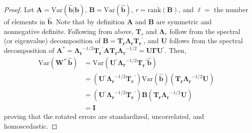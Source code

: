 \documentclass{article} %
\newcommand{\trans}{\ensuremath{^\prime}}
\newcommand{\var}{\ensuremath{\mathrm{Var}}}
\begin{document}
\begin{proof}
 Let $\bm{A} = \var(\widehat{\bm{b}} | \bm{b})$, $\bm{B} = \var(\widehat{\bm{b}})$, $r = \text{rank}(\bm{B})$, and $\ell = $ the number of elements in $\widehat{\bm{b}}$. Note that by definition $\bm{A}$ and $\bm{B}$ are symmetric and nonnegative definite. Following from above, $\bm{T}_r$ and $\bm{\Lambda}_r$ follow from the spectral (or eigenvalue) decomposition of $\bm{B} = \bm{T_r \Lambda_r T_r}\trans$, and $\bm{U}$ follows from the spectral decomposition of $\bm{A^*} = \bm{\Lambda_r}^{-1/2} \bm{T_r}\trans \bm{A T_r \Lambda_r}^{-1/2} = \bm{U} \bm{\Gamma} \bm{U}\trans$. Then, 
\begin{align*}
\var(\bm{W}^{*\prime} \widehat{\bm{b}}) &= \var(\bm{U}\trans \bm{\Lambda_r}^{-1/2} \bm{T_r}\trans \widehat{\bm{b}})\\
&= (\bm{U}\trans \bm{\Lambda_r}^{-1/2} \bm{T_r}\trans) \var(\widehat{\bm{b}}) (\bm{T_r \Lambda_r}^{-1/2} \bm{U})\\
&= (\bm{U}\trans \bm{\Lambda_r}^{-1/2} \bm{T_r}\trans) \bm{B} (\bm{T_r \Lambda_r}^{-1/2} \bm{U})\\
&= \bm{I}
\end{align*}
proving that the rotated errors are standardized, uncorrelated, and homoscedastic.
\end{proof}
 
\end{document}
